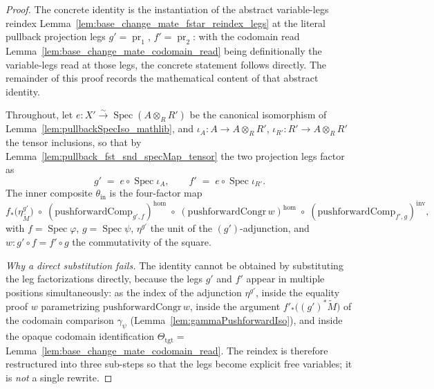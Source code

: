 \begin{proof}
  The concrete identity is the instantiation of the abstract variable-legs reindex
  Lemma~\ref{lem:base_change_mate_fstar_reindex_legs} at the literal pullback projection legs
  \(g' = \operatorname{pr}_1\), \(f' = \operatorname{pr}_2\): with the codomain read
  Lemma~\ref{lem:base_change_mate_codomain_read} being definitionally the variable-legs read at
  those legs, the concrete statement follows directly. The remainder of this proof records the
  mathematical content of that abstract identity.

  Throughout, let \(e : X' \xrightarrow{\sim} \operatorname{Spec}(A \otimes_R R')\) be the
  canonical isomorphism of Lemma~\ref{lem:pullbackSpecIso_mathlib}, and
  \(\iota_A : A \to A \otimes_R R'\), \(\iota_{R'} : R' \to A \otimes_R R'\) the tensor
  inclusions, so that by Lemma~\ref{lem:pullback_fst_snd_specMap_tensor} the two projection legs
  factor as
  \[
    g' \;=\; e \circ \operatorname{Spec}\iota_A,
    \qquad
    f' \;=\; e \circ \operatorname{Spec}\iota_{R'} .
  \]
  The inner composite \(\theta_{\mathrm{in}}\) is the four-factor map
  \[
    f_{*}\bigl(\eta^{g'}_{\widetilde M}\bigr) \;\circ\;
    (\mathrm{pushforwardComp}_{g', f})^{\mathrm{hom}} \;\circ\;
    (\mathrm{pushforwardCongr}\,w)^{\mathrm{hom}} \;\circ\;
    (\mathrm{pushforwardComp}_{f', g})^{\mathrm{inv}},
  \]
  with \(f = \operatorname{Spec}\varphi\), \(g = \operatorname{Spec}\psi\),
  \(\eta^{g'}\) the unit of the \((g')\)-adjunction, and
  \(w : g' \circ f = f' \circ g\) the commutativity of the square.

  \emph{Why a direct substitution fails.} The identity cannot be obtained by substituting the
  leg factorizations directly, because the legs \(g'\) and \(f'\) appear in multiple positions
  simultaneously: as the index of the adjunction \(\eta^{g'}\), inside the equality proof
  \(w\) parametrizing \(\mathrm{pushforwardCongr}\,w\), inside the argument
  \(f'_{*}\bigl((g')^{*}\widetilde M\bigr)\) of the codomain comparison
  \(\gamma_{\psi}\) (Lemma~\ref{lem:gammaPushforwardIso}), and inside the opaque codomain
  identification \(\Theta_{\mathrm{tgt}} = \) Lemma~\ref{lem:base_change_mate_codomain_read}.
  The reindex is therefore restructured into three sub-steps so that the legs become explicit
  free variables; it is \emph{not} a single rewrite.


\end{proof}
